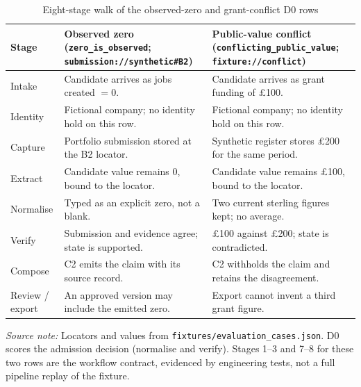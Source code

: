 \begin{table}[htbp]
  \centering
  \scriptsize
  \setlength{\tabcolsep}{2.4pt}
  \renewcommand{\arraystretch}{1.12}
  \begin{tabularx}{\textwidth}{@{}P{0.16\textwidth}P{0.40\textwidth}Y@{}}
    \toprule
    \textbf{Stage} &
    \textbf{Observed zero} (\texttt{zero\_is\_observed}; \texttt{submission://synthetic\#B2}) &
    \textbf{Public-value conflict} (\texttt{conflicting\_public\_value}; \texttt{fixture://conflict}) \\
    \midrule
    Intake & Candidate arrives as jobs created $= 0$. & Candidate arrives as grant funding of \pounds100. \\
    Identity & Fictional company; no identity hold on this row. & Fictional company; no identity hold on this row. \\
    Capture & Portfolio submission stored at the B2 locator. & Synthetic register stores \pounds200 for the same period. \\
    Extract & Candidate value remains $0$, bound to the locator. & Candidate value remains \pounds100, bound to the locator. \\
    Normalise & Typed as an explicit zero, not a blank. & Two current sterling figures kept; no average. \\
    Verify & Submission and evidence agree; state is supported. & \pounds100 against \pounds200; state is contradicted. \\
    Compose & C2 emits the claim with its source record. & C2 withholds the claim and retains the disagreement. \\
    Review / export & An approved version may include the emitted zero. & Export cannot invent a third grant figure. \\
    \bottomrule
  \end{tabularx}

  \caption{Eight-stage walk of the observed-zero and grant-conflict D0 rows}
  \label{tab:sys-claim-journey}
  \vspace{3pt}

  \parbox{\textwidth}{\scriptsize
    \textit{Source note:} Locators and values from \texttt{fixtures/evaluation\_cases.json}.
    D0 scores the admission decision (normalise and verify). Stages 1--3 and 7--8 for these
    two rows are the workflow contract, evidenced by engineering tests, not a full pipeline
    replay of the fixture.}
\end{table}
